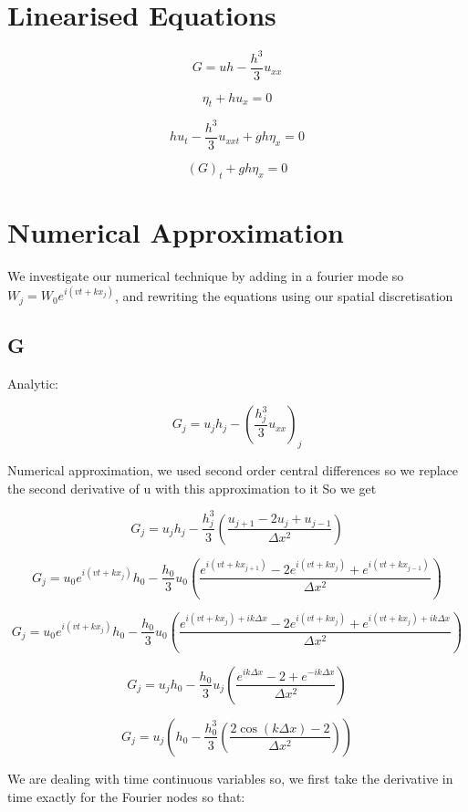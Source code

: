 \documentclass[12pt]{article}
\begin{document}
\section{Linearised Equations}



\[G = uh  -  \frac{h^3}{3} u_{xx}\]

\[\eta_t + h u_x = 0\]

\[h u_t - \frac{h^3}{3} u_{xxt}  + gh \eta_x  = 0\]

\[ \left(G\right)_t  + gh \eta_x  = 0\]

\section{Numerical Approximation}

We investigate our numerical technique by adding in a fourier mode so $W_j = W_0 e^{ i\left(vt + kx_j\right)}$, and rewriting the equations using our spatial discretisation

\subsection{G}

Analytic:

\[G_j = u_jh _j  -  (\frac{h_j^3}{3} {u_{xx}})_j\]

Numerical approximation, we used second order central differences so we replace the second derivative of u with this approximation to it
So we get

\[G_j = u_jh _j  -  \frac{h_j^3}{3} \left(\dfrac{u_{j+1} - 2 u_{j} + u_{j-1}}{\Delta x^2}\right)\]

\[G_j = u_0 e^{ i\left(vt + kx_j\right)} h_0 -  \frac{h_0}{3} u_0 \left(\dfrac{e^{ i\left(vt + kx_{j+ 1}\right)} - 2e^{ i\left(vt + kx_j\right)} +e^{ i\left(vt + kx_{j-1}\right)}}{\Delta x^2}\right)\]

\[G_j = u_0 e^{ i\left(vt + kx_j\right)} h_0 -  \frac{h_0}{3} u_0 \left(\dfrac{e^{ i\left(vt + kx_{j}\right) + ik\Delta x} - 2e^{ i\left(vt + kx_j\right)} +e^{ i\left(vt + kx_{j}\right) + ik\Delta x}}{\Delta x^2}\right)\]


\[G_j = u_j h_0 -  \frac{h_0}{3} u_j \left(\dfrac{e^{ ik\Delta x} - 2 +e^{ -ik\Delta x}}{\Delta x^2}\right)\]


\[G_j = u_j \left( h_0 -  \frac{h_0^3}{3} \left(\dfrac{2\cos\left(k{\Delta x}\right) - 2}{\Delta x^2}\right) \right)\]



We are dealing with time continuous  variables so, we first take the derivative in time exactly for the Fourier nodes so that:
\end{document}
